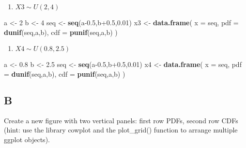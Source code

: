 \documentclass[
]{article}
\newenvironment{Shaded}{\begin{snugshade}}{\end{snugshade}}
\newcommand{\AttributeTok}[1]{\textcolor[rgb]{0.13,0.29,0.53}{#1}}
\newcommand{\DecValTok}[1]{\textcolor[rgb]{0.00,0.00,0.81}{#1}}
\newcommand{\FloatTok}[1]{\textcolor[rgb]{0.00,0.00,0.81}{#1}}
\newcommand{\FunctionTok}[1]{\textcolor[rgb]{0.13,0.29,0.53}{\textbf{#1}}}
\newcommand{\NormalTok}[1]{#1}
\newcommand{\OtherTok}[1]{\textcolor[rgb]{0.56,0.35,0.01}{#1}}
\providecommand{\tightlist}{%
  \setlength{\itemsep}{0pt}\setlength{\parskip}{0pt}}
\begin{document}
\begin{enumerate}
\def\labelenumi{\arabic{enumi}.}
\setcounter{enumi}{2}
\tightlist
\item
  \(X3 \sim U(2,4)\)
\end{enumerate}

\begin{Shaded}
\begin{Highlighting}[]
\NormalTok{a }\OtherTok{\textless{}{-}} \DecValTok{2}
\NormalTok{b }\OtherTok{\textless{}{-}} \DecValTok{4}
\NormalTok{seq }\OtherTok{\textless{}{-}} \FunctionTok{seq}\NormalTok{(a}\FloatTok{{-}0.5}\NormalTok{,b}\FloatTok{+0.5}\NormalTok{,}\FloatTok{0.01}\NormalTok{)}
\NormalTok{x3 }\OtherTok{\textless{}{-}} \FunctionTok{data.frame}\NormalTok{(}
         \AttributeTok{x =}\NormalTok{ seq,}
         \AttributeTok{pdf =} \FunctionTok{dunif}\NormalTok{(seq,a,b),}
         \AttributeTok{cdf =} \FunctionTok{punif}\NormalTok{(seq,a,b)}
\NormalTok{)}
\end{Highlighting}
\end{Shaded}

\begin{enumerate}
\def\labelenumi{\arabic{enumi}.}
\setcounter{enumi}{3}
\tightlist
\item
  \(X4 \sim U(0.8,2.5)\)
\end{enumerate}

\begin{Shaded}
\begin{Highlighting}[]
\NormalTok{a }\OtherTok{\textless{}{-}} \FloatTok{0.8} 
\NormalTok{b }\OtherTok{\textless{}{-}} \FloatTok{2.5} 
\NormalTok{seq }\OtherTok{\textless{}{-}} \FunctionTok{seq}\NormalTok{(a}\FloatTok{{-}0.5}\NormalTok{,b}\FloatTok{+0.5}\NormalTok{,}\FloatTok{0.01}\NormalTok{)}
\NormalTok{x4 }\OtherTok{\textless{}{-}} \FunctionTok{data.frame}\NormalTok{(}
         \AttributeTok{x =}\NormalTok{ seq,}
         \AttributeTok{pdf =} \FunctionTok{dunif}\NormalTok{(seq,a,b),}
         \AttributeTok{cdf =} \FunctionTok{punif}\NormalTok{(seq,a,b)}
\NormalTok{)}
\end{Highlighting}
\end{Shaded}

\hypertarget{b}{%
\subsection{B}\label{b}}

Create a new figure with two vertical panels: first row PDFs, second row
CDFs (hint: use the library cowplot and the plot\_grid() function to
arrange multiple ggplot objects).
\end{document}
